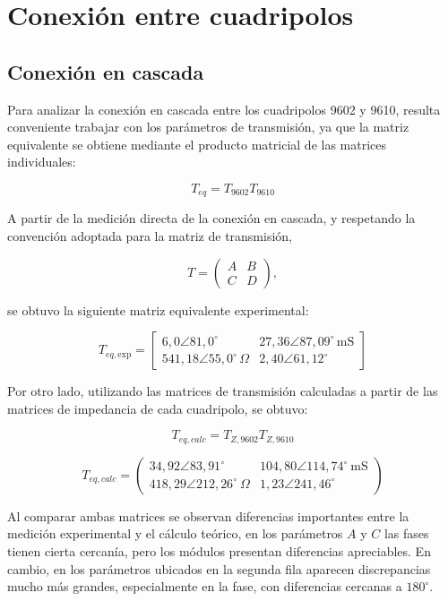 \section{Conexión entre cuadripolos}
\subsection{Conexión en cascada}

Para analizar la conexión en cascada entre los cuadripolos 9602 y 9610,
resulta conveniente trabajar con los parámetros de transmisión, ya que la
matriz equivalente se obtiene mediante el producto matricial de las matrices
individuales:

\[
T_{eq}=T_{9602}T_{9610}
\]

A partir de la medición directa de la conexión en cascada, y respetando la
convención adoptada para la matriz de transmisión,

\[
T=
\begin{pmatrix}
A & B\\
C & D
\end{pmatrix},
\]

se obtuvo la siguiente matriz equivalente experimental:

\[
T_{eq,\mathrm{exp}} =
\begin{bmatrix}6,0\angle 81,0^\circ\, & 27,36\angle 87,09^\circ\,\mathrm{mS} \\ 541,18\angle 55,0^\circ\,\Omega & 2,40\angle 61,12^\circ\,\end{bmatrix}
\]

Por otro lado, utilizando las matrices de transmisión calculadas a partir de
las matrices de impedancia de cada cuadripolo, se obtuvo:

\[
T_{eq,calc}=T_{Z,9602}T_{Z,9610}
\]

\[
T_{eq,calc}=
\begin{pmatrix}
34,92\angle83,91^\circ
&
104,80\angle114,74^\circ \ \mathrm{mS}
\\[2mm]
418,29\angle212,26^\circ \ \Omega
&
1,23\angle241,46^\circ
\end{pmatrix}
\]


Al comparar ambas matrices se observan diferencias importantes entre la
medición experimental y el cálculo teórico, en los parámetros \(A\) y \(C\) las fases tienen cierta cercanía, pero los módulos presentan diferencias apreciables. En cambio, en los parámetros
ubicados en la segunda fila aparecen discrepancias mucho más grandes, especialmente en la fase, con diferencias cercanas a \(180^\circ\).

